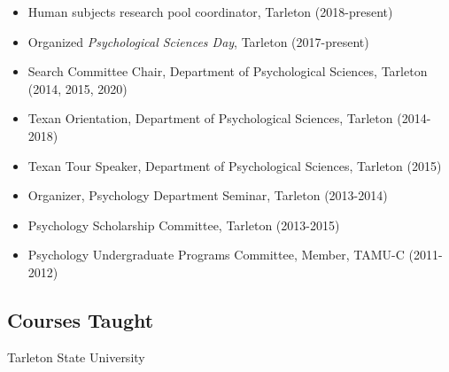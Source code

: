 \documentclass[article,10pt]{article}
\begin{document}
\begin{itemize}
\item Human subjects research pool coordinator, Tarleton (2018-present)
\item Organized \emph{Psychological Sciences Day}, Tarleton (2017-present)
\item Search Committee Chair, Department of Psychological Sciences, Tarleton (2014, 2015, 2020)
\item Texan Orientation, Department of Psychological Sciences, Tarleton (2014-2018)
\item Texan Tour Speaker, Department of Psychological Sciences, Tarleton (2015)
\item Organizer, Psychology Department Seminar, Tarleton (2013-2014)
\item Psychology Scholarship Committee, Tarleton (2013-2015)
\item Psychology Undergraduate Programs Committee, Member, TAMU-C (2011-2012)
\end{itemize}

\subsection*{Courses Taught}
\label{sec:orgdc07a36}

Tarleton State University
\end{document}

